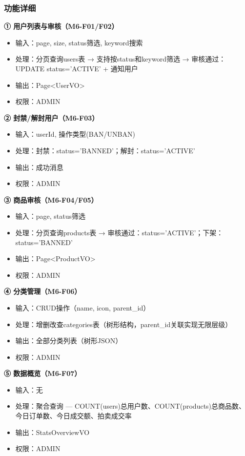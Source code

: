 \documentclass[12pt,a4paper]{ctexart}
\numberwithin{figure}{section}
\numberwithin{table}{section}
\begin{document}
\subsubsection{功能详细}

\textbf{① 用户列表与审核（M6-F01/F02）}

\begin{itemize}
    \item 输入：page, size, status筛选, keyword搜索
    \item 处理：分页查询users表 → 支持按status和keyword筛选 → 审核通过：UPDATE status='ACTIVE' + 通知用户
    \item 输出：Page<UserVO>
    \item 权限：ADMIN
\end{itemize}

\textbf{② 封禁/解封用户（M6-F03）}

\begin{itemize}
    \item 输入：userId, 操作类型(BAN/UNBAN)
    \item 处理：封禁：status='BANNED'；解封：status='ACTIVE'
    \item 输出：成功消息
    \item 权限：ADMIN
\end{itemize}

\textbf{③ 商品审核（M6-F04/F05）}

\begin{itemize}
    \item 输入：page, status筛选
    \item 处理：分页查询products表 → 审核通过：status='ACTIVE'；下架：status='BANNED'
    \item 输出：Page<ProductVO>
    \item 权限：ADMIN
\end{itemize}

\textbf{④ 分类管理（M6-F06）}

\begin{itemize}
    \item 输入：CRUD操作（name, icon, parent\_id）
    \item 处理：增删改查categories表（树形结构，parent\_id关联实现无限层级）
    \item 输出：全部分类列表（树形JSON）
    \item 权限：ADMIN
\end{itemize}

\textbf{⑤ 数据概览（M6-F07）}

\begin{itemize}
    \item 输入：无
    \item 处理：聚合查询 --- COUNT(users)总用户数、COUNT(products)总商品数、今日订单数、今日成交额、拍卖成交率
    \item 输出：StatsOverviewVO
    \item 权限：ADMIN
\end{itemize}
\end{document}
